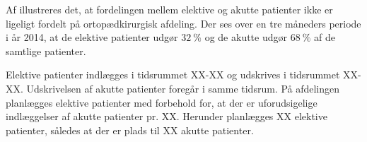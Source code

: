 \noindent
Af  illustreres det, at fordelingen mellem elektive og akutte patienter ikke er ligeligt fordelt på ortopædkirurgisk afdeling. Der ses over en tre måneders periode i år 2014, at de elektive patienter udgør $32~\%$ og de akutte udgør $68~\%$ af de samtlige patienter. 

Elektive patienter indlægges i tidsrummet XX-XX og udskrives i tidsrummet XX-XX. Udskrivelsen af akutte patienter foregår i samme tidsrum. På afdelingen planlægges elektive patienter med forbehold for, at der er uforudsigelige indlæggelser af akutte patienter pr. XX. Herunder planlægges XX elektive patienter, således at der er plads til XX akutte patienter.